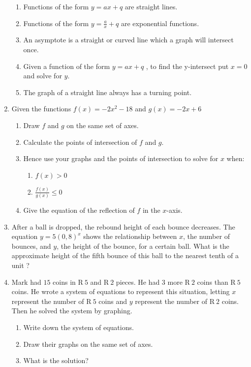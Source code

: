 \begin{eocexercises}{}
\begin{enumerate}[noitemsep, label=\textbf{\arabic*}. ]
\begin{enumerate}[noitemsep, label=\textbf{\alph*}. ]
    \item Functions of the form $y=ax+q$ are straight lines.
    \item Functions of the form $y=\frac{a}{x}+q$ are exponential functions.
    \item  An asymptote is a straight or curved line which a graph will intersect once.
    \item Given a function of the form $y=ax+q$ , to find the y-intersect put $x=0$ and solve for $y$.
    \item The graph of a straight line always has a turning point.
    \end{enumerate}
\item Given the functions $f(x)=-2{x}^{2}-18$ and $g(x)=-2x+6$
    \begin{enumerate}[noitemsep, label=\textbf{\alph*}. ] 
    \item Draw $f$ and $g$ on the same set of axes.
    \item Calculate the points of intersection of $f$ and $g$.
    \item Hence use your graphs and the points of intersection to solve for $x$ when:
	\begin{enumerate}[noitemsep, label=\textbf{\roman*}. ] 
	\item $f(x)>0$
	\item $\frac{f(x)}{g(x)}\le 0$
	\end{enumerate}
    \item Give the equation of the reflection of $f$ in the $x$-axis.
    \end{enumerate}
\item After a ball is dropped, the rebound height of each bounce decreases. The equation $y=5{(0,8)}^{x}$ shows the relationship between $x$, the number of bounces, and $y$, the height of the bounce, for a certain ball. What is the approximate height of the fifth bounce of this ball to the nearest tenth of a unit ?\newline
\item Mark had $15$ coins in R$~5$ and R$~2$ pieces. He had $3$ more R$~2$ coins than R$~5$ coins. He wrote a system of equations to represent this situation, letting $x$ represent the number of R$~5$ coins and $y$ represent the number of R$~2$ coins. Then he solved the system by graphing.
    \begin{enumerate}[noitemsep, label=\textbf{\alph*}. ] 
    \item Write down the system of equations.
    \item Draw their graphs on the same set of axes.
    \item What is the solution?
    \end{enumerate}


\end{enumerate}
\end{eocexercises}
